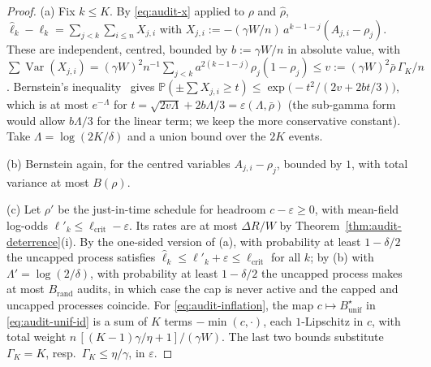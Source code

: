 \documentclass[11pt,a4paper]{article}
\newcommand{\Prob}{\mathbb{P}}
\begin{document}
\begin{proof}
(a) Fix $k\le K$. By \eqref{eq:audit-x} applied to $\rho$ and $\hat\rho$,
$\hat\ell_k-\ell_k=\sum_{j<k}\sum_{i\le n}X_{j,i}$ with
$X_{j,i}:=-(\gamma W/n)\,a^{k-1-j}(A_{j,i}-\rho_j)$. These are independent,
centred, bounded by $b:=\gamma W/n$ in absolute value, with
$\sum\operatorname{Var}(X_{j,i})=(\gamma W)^2n^{-1}\sum_{j<k}a^{2(k-1-j)}\rho_j(1-\rho_j)
\le v:=(\gamma W)^2\bar\rho\,\Gamma_K/n$. Bernstein's
inequality~\cite[Theorem~2.10 and Corollary~2.11, to be checked]{boucheron2013concentration} gives
$\Prob(\pm\sum X_{j,i}\ge t)\le\exp\bigl(-t^2/(2v+2bt/3)\bigr)$, which is at most
$e^{-\Lambda}$ for $t=\sqrt{2v\Lambda}+2b\Lambda/3=\varepsilon(\Lambda,\bar\rho)$ (the sub-gamma form would allow $b\Lambda/3$ for the linear term; we keep the more conservative constant).
Take $\Lambda=\log(2K/\delta)$ and a union bound over the $2K$ events.

(b) Bernstein again, for the centred variables $A_{j,i}-\rho_j$, bounded by $1$,
with total variance at most $B(\rho)$.

(c) Let $\rho'$ be the just-in-time schedule for headroom $c-\varepsilon\ge0$,
with mean-field log-odds $\ell'_k\le\ell_{\mathrm{crit}}-\varepsilon$. Its rates
are at most $\Delta R/W$ by Theorem~\ref{thm:audit-deterrence}(i). By the
one-sided version of (a), with probability at least $1-\delta/2$ the uncapped
process satisfies $\hat\ell_k\le\ell'_k+\varepsilon\le\ell_{\mathrm{crit}}$ for
all $k$; by (b) with $\Lambda'=\log(2/\delta)$, with probability at least
$1-\delta/2$ the uncapped process makes at most $B_{\mathrm{rand}}$ audits, in
which case the cap is never active and the capped and uncapped processes
coincide. For \eqref{eq:audit-inflation}, the map
$c\mapsto B^\star_{\mathrm{unif}}$ in \eqref{eq:audit-unif-id} is a sum of
$K$ terms $-\min(c,\cdot)$, each $1$-Lipschitz in $c$, with total weight
$n\,[(K-1)\gamma/\eta+1]/(\gamma W)$. The last two bounds substitute
$\Gamma_K=K$, resp.\ $\Gamma_K\le\eta/\gamma$, in $\varepsilon$.
\end{proof}
\end{document}
